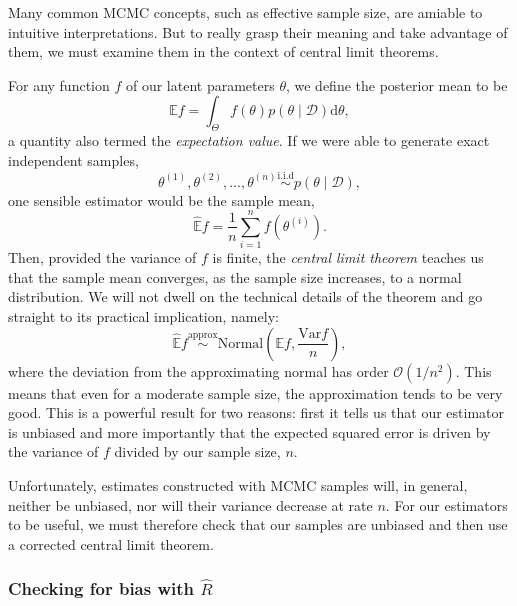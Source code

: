 Many common MCMC concepts, such as effective sample size, are amiable to intuitive interpretations.
But to really grasp their meaning and take advantage of them, we must examine them in the context of central limit theorems.

For any function $f$ of our latent parameters $\theta$, we define the posterior mean to be
\begin{equation*}
  \mathbb E f = \int_\Theta f(\theta) p(\theta \mid \mathcal D) \mathrm d \theta,
\end{equation*}
%
a quantity also termed the \textit{expectation value}.
If we were able to generate exact independent samples, 
\begin{equation*}
  \theta^{(1)}, \theta^{(2)}, ..., \theta^{(n)} \overset{\mathrm{i.i.d}}{\sim} p(\theta \mid \mathcal D),
\end{equation*}
one sensible estimator would be the sample mean,
\begin{equation*}
  \hat {\mathbb E} f = \frac{1}{n} \sum_{i = 1}^n f \left (\theta^{(i)} \right).
\end{equation*}
%
Then, provided the variance of $f$ is finite, the \textit{central limit theorem} teaches us that the sample mean converges, as the sample size increases, to a normal distribution.
We will not dwell on the technical details of the theorem and go straight to its practical implication, namely:
\begin{equation*}
  \hat {\mathbb E} f \overset{\mathrm{approx}}{\sim} \mathrm{Normal} \left ( \mathbb E f, \frac{\mathrm{Var} f}{n} \right ),
\end{equation*}
%
where the deviation from the approximating normal has order $\mathcal O(1 / n^2)$.
This means that even for a moderate sample size, the approximation tends to be very good.
This is a powerful result for two reasons: first it tells us that our estimator is unbiased and more importantly that the expected squared error is driven by the variance of $f$ divided by our sample size, $n$.

Unfortunately, estimates constructed with MCMC samples will, in general, neither be unbiased, nor will their variance decrease at rate $n$.
For our estimators to be useful, we must therefore check that our samples are unbiased and then use a corrected central limit theorem.

\subsubsection{Checking for bias with $\hat R$}

